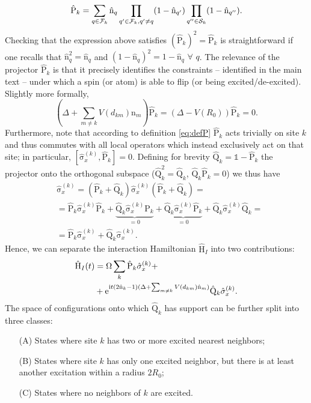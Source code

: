 \documentclass[prl,aps,twocolumn,showpacs,superscriptaddress,longbibliography]{revtex4-1}
\newcommand{\be}{\begin{equation}}
\newcommand{\ee}{\end{equation}}
\newcommand{\mal}{\mathcal}
\newcommand{\rmi}{{\rm{i}}}
\newcommand{\rme}[1]{{\rm{e}}^{#1}}
\newcommand{\lt}{\left(}
\newcommand{\rt}{\right)}
\newcommand{\comm}[2]{\left[ #1, #2 \right]}
\newcommand{\op}[1]{\mathrm{\hat{#1}}}
\begin{document}
\be
	\op{P}_k = \sum_{q \in \mal{F}_k} \op{n}_q \prod_{q' \in \mal{F}_k, \\ q' \neq q} (1 - \op{n}_{q'}) \prod_{q'' \in \mal{S}_k} (1 - \op{n}_{q''}).
	\label{eq:defP}
\ee
Checking that the expression above satisfies $\lt \op{P}_k \rt^2 = \op{P}_k$ is straightforward if one recalls that $\op{n}_q^2 = \op{n}_q$ and $(1 - \op{n}_q)^2 = 1 - \op{n}_q$ $\forall \,\,q$. The relevance of the projector $\op{P}_k$ is that it precisely identifies the constraints -- identified in the main text -- under which a spin (or atom) is able to flip (or being excited/de-excited). Slightly more formally,
\be
	(\Delta + \sum_{m \neq k} V(d_{km}) \op{n}_m) \op{P}_k = (\Delta  - V(R_0)) \op{P}_k = 0.
\ee
Furthermore, note that according to definition \eqref{eq:defP} $\op{P}_k$ acts trivially on site $k$ and thus commutes with all local operators which instead exclusively act on that site; in particular, $\comm{\op{\sigma}_x^{(k)}}{\op{P}_k} = 0$. Defining for brevity $\op{Q}_k = \mathbb{1} - \op{P}_k$ the projector onto the orthogonal subspace ($\op{Q}_k^2 = \op{Q}_k$, $\op{Q}_k \op{P}_k = 0$) we thus have
\be
\begin{split}
	& \op{\sigma}_x^{(k)} = \lt \op{P}_k + \op{Q}_k \rt	\op{\sigma}_x^{(k)}\lt \op{P}_k + \op{Q}_k \rt = \\
	&= \op{P}_k \op{\sigma}_x^{(k)}\op{P}_k + \underbrace{\op{Q}_k \op{\sigma}_x^{(k)}\op{P}_k}_{=0} + \underbrace{\op{Q}_k \op{\sigma}_x^{(k)}\op{P}_k}_{=0} + \op{Q}_k \op{\sigma}_x^{(k)}\op{Q}_k = \\
	& = \op{P}_k \op{\sigma}_x^{(k)} + \op{Q}_k \op{\sigma}_x^{(k)}.
\end{split}
\ee
Hence, we can separate the interaction Hamiltonian $\op{H}_I$ into two contributions:
\be
\begin{split}
	\op{H}_I(t) &= \Omega \sum_{k} \op{P}_k \op{\sigma}_x^{(k)} + \\
	&+ \rme{\rmi t (2\op{n}_k - 1) (\Delta + \sum_{m \neq k} V(d_{km}) \op{n}_m)} \op{Q}_k \op{\sigma}_x^{(k)}.
\end{split}
\ee
The space of configurations onto which $\op{Q}_k$ has support can be further split into three classes:
\begin{itemize}
	\item[(A)] States where site $k$ has two or more excited nearest neighbors;
	\item[(B)] States where site $k$ has only one excited neighbor, but there is at least another excitation within a radius $2R_0$;
	\item[(C)] States where no neighbors of $k$ are excited.
\end{itemize}
\end{document}
